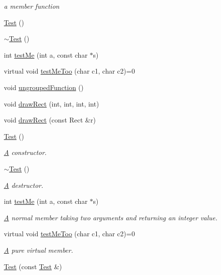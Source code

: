 \begin{DoxyCompactItemize}
\begin{DoxyCompactList}\small\item\em a member function \end{DoxyCompactList}\item 
\hyperlink{classTest_a44e3a28c552193de099601e2910531f1}{Test} ()
\item 
\hyperlink{classTest_a31b169208ad4fc5344a7b6b8e1fd00c1}{$\sim$\-Test} ()
\item 
int \hyperlink{classTest_ab89e4a0d841b51185817c5c7ae739ea4}{test\-Me} (int a, const char $\ast$s)
\item 
virtual void \hyperlink{classTest_ada2b629a324d987f40de6e72196526a5}{test\-Me\-Too} (char c1, char c2)=0
\item 
void \hyperlink{classTest_ae3d5d66760866dc4caf371ccef859ba6}{ungrouped\-Function} ()
\item 
void \hyperlink{classTest_a6b16f6be500388342845646c1969d3aa}{draw\-Rect} (int, int, int, int)
\item 
void \hyperlink{classTest_aadf47113ad9dcd5600cb22e3bcff5258}{draw\-Rect} (const Rect \&r)
\item 
\hyperlink{classTest_a44e3a28c552193de099601e2910531f1}{Test} ()
\begin{DoxyCompactList}\small\item\em \hyperlink{classA}{A} constructor. \end{DoxyCompactList}\item 
\hyperlink{classTest_a31b169208ad4fc5344a7b6b8e1fd00c1}{$\sim$\-Test} ()
\begin{DoxyCompactList}\small\item\em \hyperlink{classA}{A} destructor. \end{DoxyCompactList}\item 
int \hyperlink{classTest_ab89e4a0d841b51185817c5c7ae739ea4}{test\-Me} (int a, const char $\ast$s)
\begin{DoxyCompactList}\small\item\em \hyperlink{classA}{A} normal member taking two arguments and returning an integer value. \end{DoxyCompactList}\item 
virtual void \hyperlink{classTest_ada2b629a324d987f40de6e72196526a5}{test\-Me\-Too} (char c1, char c2)=0
\begin{DoxyCompactList}\small\item\em \hyperlink{classA}{A} pure virtual member. \end{DoxyCompactList}\item 
\hyperlink{classTest_adcf1bc755df94c4d07519c0a02aa1cc0}{Test} (const \hyperlink{classTest}{Test} \&)
\end{DoxyCompactItemize}
